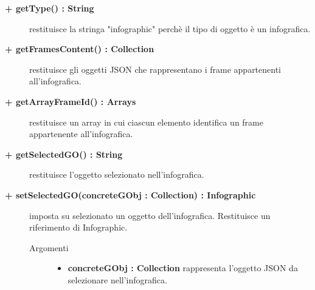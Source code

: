 \begin{description}
\begin{description}
\end{description}

\begin{description}
		\item[\textbf{\color{blue}+ getType() : String			}] \hfill
			restituisce la stringa "infographic" perchè il tipo di oggetto è un infografica.

\end{description}

\begin{description}
		\item[\textbf{\color{blue}+ getFramesContent() : Collection			}] \hfill
			restituisce gli oggetti JSON che rappresentano i frame appartenenti all'infografica.

\end{description}

\begin{description}
		\item[\textbf{\color{blue}+ getArrayFrameId() : Arrays			}] \hfill
			restituisce un array in cui ciascun elemento identifica un frame appartenente all'infografica.

\end{description}

\begin{description}
		\item[\textbf{\color{blue}+ getSelectedGO() : String			}] \hfill
			restituisce l'oggetto selezionato nell'infografica.

\end{description}

\begin{description}
		\item[\textbf{\color{blue}+ setSelectedGO(concreteGObj : Collection) : Infographic			}] \hfill
			imposta su selezionato un oggetto dell'infografica. Restituisce un riferimento di Infographic.

		\begin{description}
			\item[Argomenti] \hfill
				\begin{itemize}
				
					\item \textbf{concreteGObj : Collection			} \hfill
					rappresenta l'oggetto JSON da selezionare nell'infografica.
				\end{itemize}
		\end{description}

\end{description}


\end{description}
